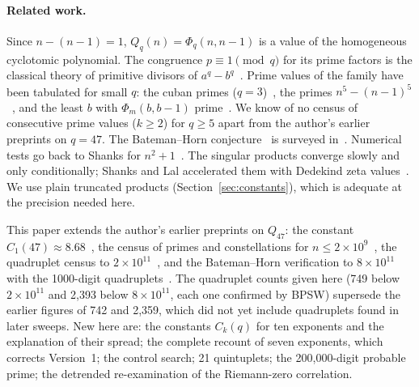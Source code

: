 \documentclass[11pt,a4paper]{article}
\theoremstyle{remark}
\begin{document}
\paragraph{Related work.} Since $n-(n-1)=1$, $Q_q(n)=\Phi_q(n,n-1)$ is a value of the homogeneous cyclotomic polynomial. The congruence $p\equiv1\pmod q$ for its prime factors is the classical theory of primitive divisors of $a^q-b^q$~\cite{Zsig,BV}. Prime values of the family have been tabulated for small $q$: the cuban primes ($q=3$)~\cite{Cuban}, the primes $n^5-(n-1)^5$~\cite{A121616}, and the least $b$ with $\Phi_m(b,b-1)$ prime~\cite{A250201}. We know of no census of consecutive prime values ($k\ge2$) for $q\ge5$ apart from the author's earlier preprints on $q=47$. The Bateman--Horn conjecture~\cite{BH} is surveyed in~\cite{AFG}. Numerical tests go back to Shanks for $n^2+1$~\cite{Shanks}. The singular products converge slowly and only conditionally; Shanks and Lal accelerated them with Dedekind zeta values~\cite{ShanksLal}. We use plain truncated products (Section~\ref{sec:constants}), which is adequate at the precision needed here.

This paper extends the author's earlier preprints on $Q_{47}$: the constant $C_1(47)\approx8.68$~\cite{Chen1}, the census of primes and constellations for $n\le2\times10^9$~\cite{Chen2}, the quadruplet census to $2\times10^{11}$~\cite{Chen3}, and the Bateman--Horn verification to $8\times10^{11}$ with the 1000-digit quadruplets~\cite{BHver}. The quadruplet counts given here (749 below $2\times10^{11}$ and 2,393 below $8\times10^{11}$, each one confirmed by BPSW) supersede the earlier figures of 742 and 2,359, which did not yet include quadruplets found in later sweeps. New here are:
the constants $C_k(q)$ for ten exponents and the explanation of their spread;
the complete recount of seven exponents, which corrects Version~1;
the control search;
21 quintuplets;
the 200,000-digit probable prime;
the detrended re-examination of the Riemann-zero correlation.
\end{document}
